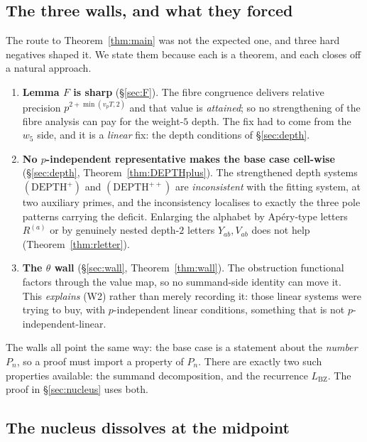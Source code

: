 \documentclass[11pt,reqno]{amsart}
\theoremstyle{plain}
\theoremstyle{definition}
\theoremstyle{remark}
\numberwithin{equation}{section}
\newcommand{\LBZ}{L_{\mathrm{BZ}}}
\newcommand{\wfive}{w_5}
\begin{document}
\subsection{The three walls, and what they forced}

The route to Theorem~\ref{thm:main} was not the expected one, and three hard negatives shaped
it. We state them because each is a theorem, and each closes off a natural approach.

\begin{enumerate}[leftmargin=1.9em,label=\textup{(W\arabic*)}]
\item \textbf{Lemma $F$ is sharp} (\S\ref{sec:F}). The fibre congruence delivers relative
  precision $p^{2+\min(v_pT,2)}$ and that value is \emph{attained}; so no strengthening of the
  fibre analysis can pay for the weight-$5$ depth. The fix had to come from the $\wfive$ side,
  and it is a \emph{linear} fix: the depth conditions of \S\ref{sec:depth}.
\item \textbf{No $p$-independent representative makes the base case cell-wise}
  (\S\ref{sec:depth}, Theorem~\ref{thm:DEPTHplus}). The strengthened depth systems
  $(\mathrm{DEPTH}^+)$ and $(\mathrm{DEPTH}^{++})$ are \emph{inconsistent} with the fitting
  system, at two auxiliary primes, and the inconsistency localises to exactly the three pole
  patterns carrying the deficit. Enlarging the alphabet by Ap\'ery-type letters
  $R^{(a)}$ or by genuinely nested depth-$2$ letters $Y_{ab},V_{ab}$ does not help
  (Theorem~\ref{thm:rletter}).
\item \textbf{The $\theta$ wall} (\S\ref{sec:wall}, Theorem~\ref{thm:wall}). The obstruction
  functional factors through the value map, so no summand-side identity can move it. This
  \emph{explains} (W2) rather than merely recording it: those linear systems were trying to
  buy, with $p$-independent linear conditions, something that is not $p$-independent-linear.
\end{enumerate}

The walls all point the same way: the base case is a statement about the \emph{number} $P_n$,
so a proof must import a property of $P_n$. There are exactly two such properties available:
the summand decomposition, and the recurrence $\LBZ$. The proof in \S\ref{sec:nucleus} uses
both.

\subsection{The nucleus dissolves at the midpoint}
\end{document}
